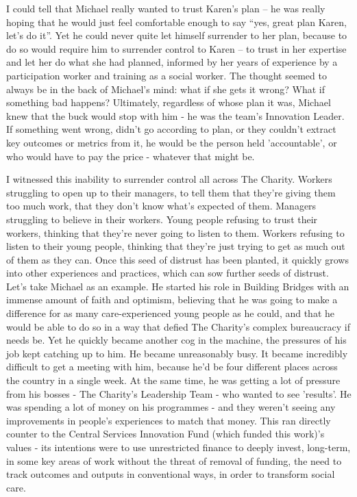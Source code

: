 I could tell that Michael really wanted to trust Karen’s plan – he was really hoping that he would just feel comfortable enough to say “yes, great plan Karen, let’s do it”. Yet he could never quite let himself surrender to her plan, because to do so would require him to surrender control to Karen – to trust in her expertise and let her do what she had planned, informed by her years of experience by a participation worker and training as a social worker. The thought seemed to always be in the back of Michael’s mind: what if she gets it wrong? What if something bad happens? Ultimately, regardless of whose plan it was, Michael knew that the buck would stop with him - he was the team's Innovation Leader.  If something went wrong, didn’t go according to plan, or they couldn’t extract key outcomes or metrics from it, he would be the person held 'accountable', or who would have to pay the price - whatever that might be. 

I witnessed this inability to surrender control all across The Charity. Workers struggling to open up to their managers, to tell them that they’re giving them too much work, that they don’t know what's expected of them. Managers struggling to believe in their workers. Young people refusing to trust their workers, thinking that they’re never going to listen to them. Workers refusing to listen to their young people, thinking that they’re just trying to get as much out of them as they can. Once this seed of distrust has been planted, it quickly grows into other experiences and practices, which can sow further seeds of distrust. Let’s take Michael as an example. He started his role in Building Bridges with an immense amount of faith and optimism, believing that he was going to make a difference for as many care-experienced young people as he could, and that he would be able to do so in a way that defied The Charity's complex bureaucracy if needs be. Yet he quickly became another cog in the machine, the pressures of his job kept catching up to him. He became unreasonably busy. It became incredibly difficult to get a meeting with him, because he’d be four different places across the country in a single week. At the same time, he was getting a lot of pressure from his bosses - The Charity’s Leadership Team - who wanted to see 'results'. He was spending a lot of money on his programmes - and they weren’t seeing any improvements in people’s experiences to match that money. This ran directly counter to the Central Services Innovation Fund (which funded this work)'s values - its intentions were to use unrestricted finance to deeply invest, long-term, in some key areas of work without the threat of removal of funding, the need to track outcomes and outputs in conventional ways, in order to transform social care.

